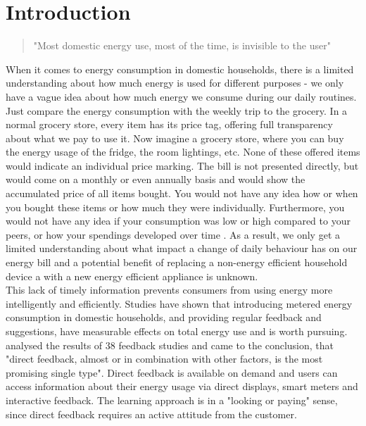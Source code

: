 
\chapter{Introduction}
\label{ch:Introduction}

\begin{quotation}
"Most domestic energy use, most of the time, is invisible to the user" 
\begin{flushright}
\cite{Darby2006}
\end{flushright}
\end{quotation}

When it comes to energy consumption in domestic households, there is a limited understanding about how much energy is used for different purposes - we only have a vague idea about how much energy we consume during our daily routines. Just compare the energy consumption with the weekly trip to the grocery. In a normal grocery store, every item has its price tag, offering full transparency about what we pay to use it. Now imagine a grocery store, where you can buy the energy usage of the fridge, the room 
lightings, etc. None of these offered items would indicate an individual price marking. The bill is not presented directly, but would come on a monthly or even annually basis and would show the accumulated price of all items bought. You would not have any idea how or when you bought these items or how much they were individually. Furthermore, you would not have any idea if your consumption was low or high compared to your peers, or how your spendings developed over time  \citep{Kempton1994}. As a result, we only get a limited understanding about what impact a change of daily behaviour has on our energy bill  \citep{Darby2006} and a potential benefit of replacing a non-energy efficient household device a with a new energy efficient appliance is unknown.\\
This lack of timely information prevents consumers from using energy more intelligently and efficiently\citep{Darby2000}.
Studies have shown that introducing metered energy consumption in domestic households, and providing regular feedback and suggestions, have measurable effects on total energy use and is worth pursuing.  
 \cite{Darby2000} analysed the results of 38 feedback studies and came to the conclusion, that "direct feedback, almost or in combination with other factors, is the most promising single type". Direct feedback is available on demand and users can access information about their energy usage via direct displays, smart meters and interactive feedback. The learning approach is in a "looking or paying" sense, since direct feedback requires an active attitude from the customer.

